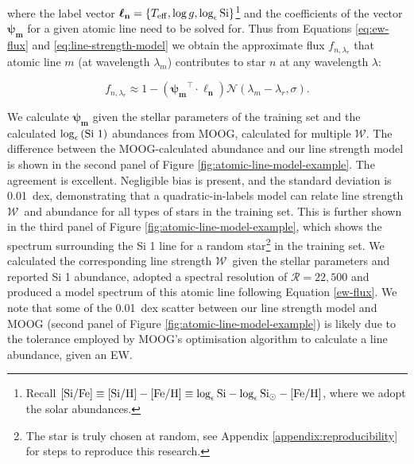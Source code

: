\documentclass[useAMS,usenatbib]{mn2e}
\newcommand\lv{\mathbf{\boldsymbol\ell_n}}
\newcommand{\logeps}[1]{\log_{\epsilon}{\rm #1}}
\newcommand\ew{$\mathcal{W}$}
\newcommand\psiv{\mathbf{\boldsymbol{\psi}_m}}
\begin{document}
\noindent{}where the label vector 
$\lv = \{T_{\rm eff},\log{g},\log_{\epsilon}{\rm Si}\}$\footnote{Recall
${\rm [Si/Fe]} \equiv {\rm [Si/H]} - {\rm [Fe/H]} \equiv \log_{\epsilon}{\rm Si} 
- \log_{\epsilon}{\rm Si}_\odot - {\rm [Fe/H]}$, where we adopt the \citet{Asplund2009}
solar abundances.} and the coefficients of the vector $\psiv$ for a given 
atomic line need to be solved for. Thus from Equations \ref{eq:ew-flux} and
\ref{eq:line-strength-model} we obtain the approximate flux $f_{n,\lambda_r}$ that 
atomic line $m$ (at wavelength $\lambda_m$) contributes to star $n$ at any
wavelength $\lambda$:

\begin{equation}
f_{n,\lambda_r} \approx 1 - \left(\psiv^{\intercal}\cdot\lv\right)\mathcal{N}\left(\lambda_{m} - \lambda_r,\sigma\right).
\end{equation}

We calculate $\psiv$ given the stellar parameters of the training set and the
calculated $\logeps{(Si~1)}$ abundances from MOOG, calculated for multiple \ew.
The difference between the MOOG-calculated abundance and our line strength model
is shown in the second panel of Figure \ref{fig:atomic-line-model-example}.
The agreement is excellent. Negligible bias is present, and the standard deviation is 0.01~dex, demonstrating
that a quadratic-in-labels model can relate line strength \ew\ and abundance
for all types of stars in the training set. This is further shown in the third panel of 
Figure \ref{fig:atomic-line-model-example},
which shows the spectrum surrounding the Si 1 line for a random star\footnote{The
star is truly chosen at random, see Appendix \ref{appendix:reproducibility} for steps
to reproduce this research.} in the training set. We calculated the corresponding
line strength \ew\ given the stellar parameters and reported Si 1 abundance, 
adopted a spectral resolution of $\mathcal{R} = 22,500$ and produced a model 
spectrum of this atomic line following Equation \ref{ew-flux}. We note that some 
of the 0.01~dex scatter between our 
line strength model and MOOG (second panel of Figure 
\ref{fig:atomic-line-model-example}) is likely due to the tolerance employed by 
MOOG's optimisation algorithm to calculate a line abundance, given an EW. 

\end{document}
